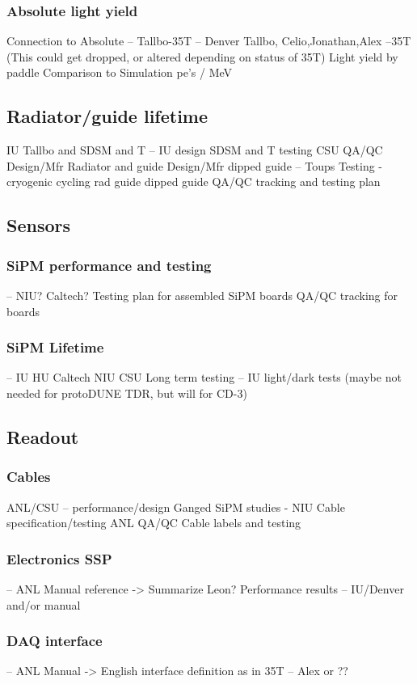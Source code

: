 \subsubsection{ Absolute light yield}
     Connection to Absolute -- Tallbo-35T  -- Denver Tallbo, Celio,Jonathan,Alex --35T
     (This could get dropped, or altered depending on status of 35T)
     Light yield by paddle
     Comparison to Simulation
     pe's / MeV 
\subsection{Radiator/guide lifetime}
     IU Tallbo and SDSM and T  -- IU design SDSM and T testing  CSU QA/QC
     Design/Mfr Radiator and guide
     Design/Mfr dipped guide -- Toups
     Testing - cryogenic cycling 
          rad
          guide
          dipped guide
     QA/QC tracking and testing plan  
\subsection{Sensors}
\subsubsection{SiPM performance and testing}
      -- NIU? Caltech?
     Testing plan for assembled SiPM boards
     QA/QC tracking for boards     
\subsubsection{SiPM Lifetime}
      -- IU HU Caltech NIU CSU 
     Long term testing -- IU light/dark tests     
     (maybe not needed for protoDUNE TDR, but will for CD-3)
\subsection{Readout}
\subsubsection{Cables}
     ANL/CSU -- performance/design 
     Ganged SiPM studies - NIU
     Cable specification/testing ANL
     QA/QC Cable labels and testing
\subsubsection{Electronics SSP}
      -- ANL Manual reference -> Summarize  Leon?
     Performance results -- IU/Denver and/or manual
\subsubsection{DAQ interface}
      -- ANL Manual -> English 
     interface definition as in 35T  -- Alex or ??

